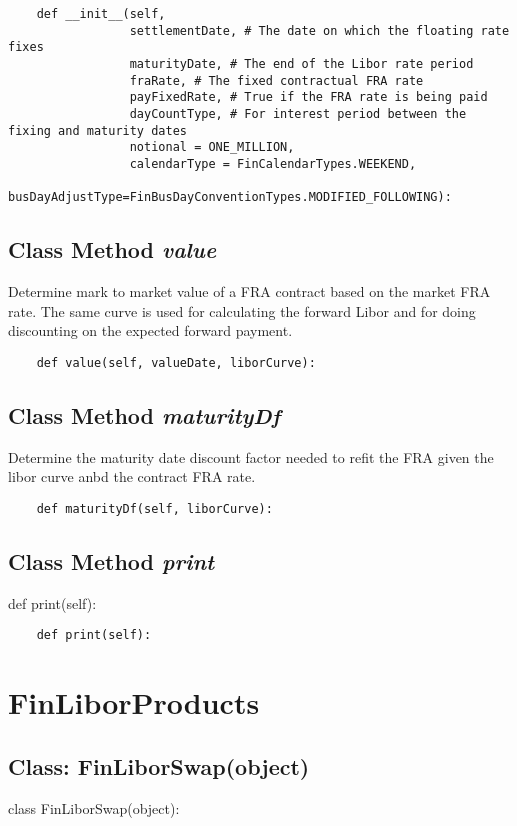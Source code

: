 \documentclass[twoside,11pt]{book}
\begin{document}
\begin{lstlisting}
    def __init__(self, 
                 settlementDate, # The date on which the floating rate fixes
                 maturityDate, # The end of the Libor rate period
                 fraRate, # The fixed contractual FRA rate
                 payFixedRate, # True if the FRA rate is being paid
                 dayCountType, # For interest period between the fixing and maturity dates
                 notional = ONE_MILLION, 
                 calendarType = FinCalendarTypes.WEEKEND,
                 busDayAdjustType=FinBusDayConventionTypes.MODIFIED_FOLLOWING):
\end{lstlisting}

\subsection{Class Method {\it value}}
Determine mark to market value of a FRA contract based on the market FRA rate. The same curve is used for calculating the forward Libor and for doing discounting on the expected forward payment. 

\begin{lstlisting}
    def value(self, valueDate, liborCurve):
\end{lstlisting}

\subsection{Class Method {\it maturityDf}}
Determine the maturity date discount factor needed to refit the FRA given the libor curve anbd the contract FRA rate. 

\begin{lstlisting}
    def maturityDf(self, liborCurve):
\end{lstlisting}

\subsection{Class Method {\it print}}
def print(self):

\begin{lstlisting}
    def print(self):
\end{lstlisting}

\newpage
\section{FinLiborProducts}

\subsection{Class: FinLiborSwap(object)}
class FinLiborSwap(object):
\end{document}

